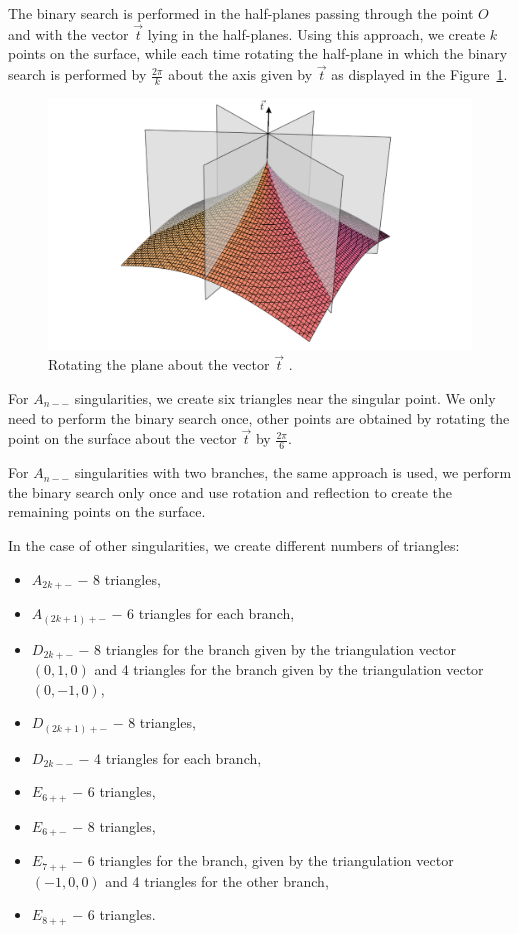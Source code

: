 The binary search is performed in the half-planes passing through the point
$O$ and with the vector $\vec{t}$ lying in the half-planes.
Using this approach, we create $k$ points on the surface, while each time
rotating the half-plane in which the binary search is performed by $\frac{2\pi}{k}$
about the axis given by $\vec{t}$ as displayed in the Figure~\ref{img:rotating-planes}.

\begin{figure}
    \centerline{\includegraphics[scale=0.5]{images/rotating-planes}}
    \caption[Rotating the plane about the vector]
    {Rotating the plane about the vector $\vec{t}$ \cite{calcplot3d}.}
    \label{img:rotating-planes}
\end{figure}

For $A_{n--}$ singularities, we create six
triangles near the singular point. We only need to perform the binary search once,
other points are obtained by rotating the point on the surface about the vector 
$\vec{t}$ by $\frac{2 \pi}{6}$.

For $A_{n--}$ singularities with two branches, the same approach is used,
we perform the binary search only once and use rotation and
reflection to create the remaining points on the surface.

In the case of other singularities, we create different numbers of triangles:
\begin{itemize}
    \item $A_{2k+-}$ $-$ 8 triangles,
    \item $A_{(2k+1)+-}$ $-$ 6 triangles for each branch,
    \item $D_{2k+-}$ $-$ 8 triangles for the branch given by the 
    triangulation vector $(0,1,0)$ and 4 triangles for the branch
    given by the triangulation vector $(0,-1,0)$,
    \item $D_{(2k+1)+-}$ $-$ 8 triangles,
    \item $D_{2k--}$ $-$ 4 triangles for each branch,
    \item $E_{6++}$ $-$ 6 triangles,
    \item $E_{6+-}$ $-$ 8 triangles,
    \item $E_{7++}$ $-$ 6 triangles for the branch, given by the
    triangulation vector $(-1, 0, 0)$ and 4 triangles for the other
    branch,
    \item $E_{8++}$ $-$ 6 triangles.
\end{itemize}

